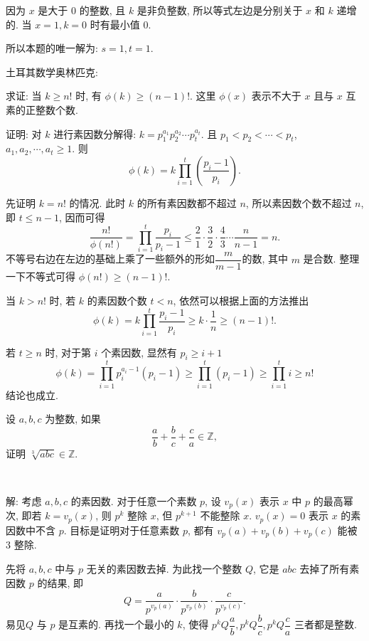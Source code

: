 因为 $ x $ 是大于 0 的整数, 且 $ k $ 是非负整数, 所以等式左边是分别关于 $ x $ 和 $ k $ 递增的. 当 $ x = 1, k = 0 $ 时有最小值 0.

所以本题的唯一解为: $ s = 1, t = 1 $.


\newpage

 土耳其数学奥林匹克:

求证: 当 $k \ge n!$ 时, 有 $\phi(k) \ge (n-1)!$. 这里 $\phi(x)$ 表示不大于 $x$ 且与 $x$ 互素的正整数个数.


证明: 对 $k$ 进行素因数分解得: $k = p_1^{a_1}p_2^{a_2}\cdots p_t^{a_t}$. 且 $p_1<p_2<\cdots<p_t$, $a_1, a_2, \cdots, a_t \ge 1$. 则 
\[
\phi(k) = k\prod_{i=1}^t(\frac{p_i-1}{p_i}).
\]

先证明 $k = n!$ 的情况. 此时 $k$ 的所有素因数都不超过 $n$, 所以素因数个数不超过 $n$, 即 $t\le n - 1$, 因而可得
\[\frac{n!}{\phi(n!)} = \prod_{i=1}^t\frac{p_i}{p_i-1} \le \frac{2}{1}\cdot\frac{3}{2}\cdot\frac{4}{3}\cdots\frac{n}{n-1} = n.\]
不等号右边在左边的基础上乘了一些额外的形如$\dfrac{m}{m-1}$的数, 其中 $m$ 是合数. 整理一下不等式可得 $\phi(n!) \ge (n-1)!$.

当 $k > n!$ 时, 若 $k$ 的素因数个数 $t < n$, 依然可以根据上面的方法推出 
\[\phi(k) =  k\prod_{i=1}^t\frac{p_i-1}{p_i} \ge k\cdot\frac{1}{n} \ge (n-1)! .\]

若 $t \ge n$ 时, 对于第 $i$ 个素因数, 显然有 $p_i \ge i + 1$
\[\phi(k) = \prod_{i=1}^t{p_i^{a_i-1}(p_i-1)} \ge \prod_{i=1}^t(p_i-1) \ge \prod_{i=1}^t i \ge n!\]
结论也成立.


\newpage
设 $a,b,c$ 为整数, 如果 
\[ \frac{a}{b} + \frac{b}{c} + \frac{c}{a} \in \mathbb{Z} ,\]
证明 $\sqrt[3]{abc} \in \mathbb{Z} $.

~

解: 考虑 $a,b,c$ 的素因数. 对于任意一个素数 $p$, 设 $v_p(x)$ 表示 $x$ 中 $p$ 的最高幂次, 即若 $k = v_p(x)$, 则 $p^k$ 整除 $x$, 但 $p^{k+1}$ 不能整除 $x$. $v_p(x) = 0$ 表示 $x$ 的素因数中不含 $p$. 目标是证明对于任意素数 $p$, 都有 $v_p(a) + v_p(b) + v_p(c)$ 能被 $3$ 整除.

先将 $a,b,c$ 中与 $p$ 无关的素因数去掉. 为此找一个整数 $Q$, 它是 $abc$ 去掉了所有素因数 $p$ 的结果, 即
\[ Q = \frac{a}{p^{v_p(a)}}\cdot\frac{b}{p^{v_p(b)}}\cdot\frac{c}{p^{v_p(c)}} .\]
易见$Q$ 与 $p$ 是互素的. 再找一个最小的 $k$, 使得 $p^kQ\dfrac{a}{b}, p^kQ\dfrac{b}{c}, p^kQ\dfrac{c}{a}$ 三者都是整数.

